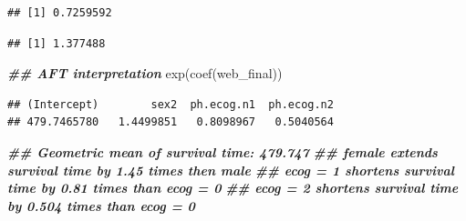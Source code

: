 \documentclass[
]{article}
\newenvironment{Shaded}{\begin{snugshade}}{\end{snugshade}}
\newcommand{\AttributeTok}[1]{\textcolor[rgb]{0.77,0.63,0.00}{#1}}
\newcommand{\CommentTok}[1]{\textcolor[rgb]{0.56,0.35,0.01}{\textit{#1}}}
\newcommand{\DecValTok}[1]{\textcolor[rgb]{0.00,0.00,0.81}{#1}}
\newcommand{\DocumentationTok}[1]{\textcolor[rgb]{0.56,0.35,0.01}{\textbf{\textit{#1}}}}
\newcommand{\FunctionTok}[1]{\textcolor[rgb]{0.00,0.00,0.00}{#1}}
\newcommand{\NormalTok}[1]{#1}
\newcommand{\OtherTok}[1]{\textcolor[rgb]{0.56,0.35,0.01}{#1}}
\newcommand{\SpecialCharTok}[1]{\textcolor[rgb]{0.00,0.00,0.00}{#1}}
\newcommand{\StringTok}[1]{\textcolor[rgb]{0.31,0.60,0.02}{#1}}
\begin{document}
\begin{Shaded}
\end{Shaded}

\begin{verbatim}
## [1] 0.7259592
\end{verbatim}

\begin{Shaded}
\end{Shaded}

\begin{verbatim}
## [1] 1.377488
\end{verbatim}

\begin{Shaded}
\begin{Highlighting}[]
\DocumentationTok{\#\# AFT interpretation}
\FunctionTok{exp}\NormalTok{(}\FunctionTok{coef}\NormalTok{(web\_final))}
\end{Highlighting}
\end{Shaded}

\begin{verbatim}
## (Intercept)        sex2  ph.ecog.n1  ph.ecog.n2 
## 479.7465780   1.4499851   0.8098967   0.5040564
\end{verbatim}

\begin{Shaded}
\begin{Highlighting}[]
\DocumentationTok{\#\# Geometric mean of survival time: 479.747}
\DocumentationTok{\#\# female extends survival time by 1.45 times then male}
\DocumentationTok{\#\# ecog = 1 shortens survival time by 0.81 times than ecog = 0}
\DocumentationTok{\#\# ecog = 2 shortens survival time by 0.504 times than ecog = 0}
\end{Highlighting}
\end{Shaded}
\end{document}
